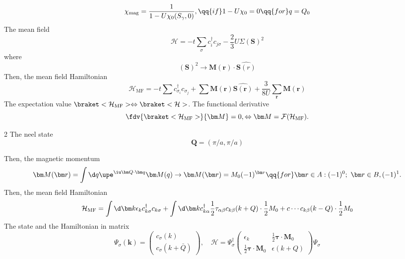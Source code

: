 \begin{equation}
  \chi_\text{mag} = \frac1{1 - U\chi_0(S_\gamma, 0)}, \qq{if}
  1 - U\chi_0 = 0 \qq{for} q = Q_0
\end{equation}
The mean field
\begin{equation}
  \mathcal H = -t \sum_\sigma c_i^\dagger c_{j\sigma}
- \frac23 U\Sigma(\mathbf S)^2
\end{equation}
where
\[
  (\mathbf S)^2 \to \bm M(\bm r) \cdot \hat{\mathbf S(r)}
\]
Then, the mean field Hamiltonian
\begin{equation}
  \mathcal H_\text{MF} = -t \sum c_{\sigma_i}^\dagger c_{\sigma_j}
+ \sum \bm M(\bm r) \hat{\mathbf S(\bm r)}
+ \frac3{8U}  \sum_{\bm r} \bm M(\bm r)
\end{equation}
The expectation
value $\braket<\mathcal H_\text{MF}> \Leftrightarrow \braket<\mathcal H>$.
The functional derivative
\[
  \fdv{\braket<\mathcal H_\text{MF}>}{\bm M} = 0, \Leftrightarrow
  \bm M = \mathcal F(\mathcal H_\text{MF}).
\]
\begin{paracol}{2}
The neel state
\[
  \bm Q = (\pi/a, \pi/a)
\]
\switchcolumn \centering
{}
\end{paracol}
Then, the magnetic momentum
\begin{equation}
  \bm M(\bm r) = \int \d q \upe^{\iu \bm Q \cdot \bm q} \bm M(q) \to
  \bm M(\bm r) = M_0(-1)^{\bm r}
  \qq{for} \bm r \in A: (-1)^0;\ \bm r \in B, (-1)^1.
\end{equation}
Then, the mean field Hamiltonian
\begin{equation}
  \mathcal H_\text{MF} = \int \d\bm k \epsilon_k c_{k\sigma}^\dagger c_{k\sigma}
+ \int \d\bm k c_{k\alpha}^\dagger \frac12 \tau_{\alpha\beta} c_{k\beta} (k + Q)
  \cdot \frac12 M_0
  + c \cdots c_{k\beta}(k - Q) \cdot \frac12 M_0
\end{equation}
The state and the Hamiltonian in matrix
\begin{equation}
  \Psi_\sigma(\bm k) =
  \begin{pmatrix}
    c_\sigma(k)\\
    c_\sigma(k + \bar Q)
  \end{pmatrix}, \quad
  \mathcal H = \Psi_\sigma^\dagger
  \begin{pmatrix}
    \epsilon_k & \frac12\bm\tau \cdot \bm M_0\\
    \frac12\bm \tau \cdot \bm M_0 & \epsilon(k + Q)
  \end{pmatrix}\Psi_\sigma
\end{equation}
